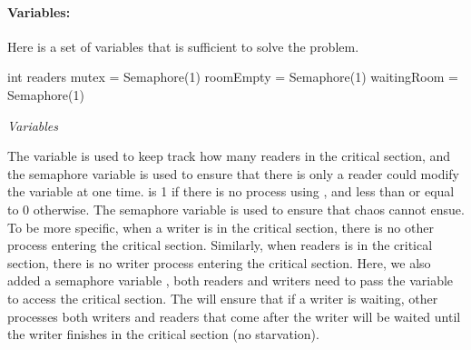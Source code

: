 \documentclass[a4paper, 10pt]{article}
\begin{document}
\paragraph{Variables:}  Here is a set of variables that is sufficient to solve the problem.  
\begin{mycodeblock}
int readers
mutex = Semaphore(1)
roomEmpty = Semaphore(1)
waitingRoom = Semaphore(1)
\end{mycodeblock}
\begin{center}
\textit{Variables}
\end{center}
The {} variable is used to keep track how many readers in the critical section, and the semaphore variable {} is used to ensure that there is only a reader could modify the {} variable at one time. {} is 1 if there is no process using {}, and less than or equal to 0 otherwise. The semaphore variable {} is used to ensure that chaos cannot ensue. To be more specific, when a writer is in the critical section, there is no other process entering the critical section. Similarly, when readers is in the critical section, there is no writer process entering the critical section. Here, we also added a semaphore variable {}, both readers and writers need to pass the variable {} to access the critical section. The {} will ensure that if a writer is waiting, other processes both writers and readers that come after the writer will be waited until the writer finishes in the critical section (no starvation).
\end{document}
